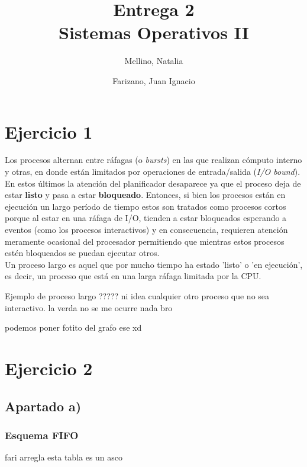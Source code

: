 \documentclass[11pt]{article}
\title{
    Entrega 2 \\
    \large Sistemas Operativos II}
\author{Mellino, Natalia \and Farizano, Juan Ignacio}
\date{}
\begin{document}
\maketitle


\section*{Ejercicio 1}

Los procesos alternan entre ráfagas (o \emph{bursts}) en las que realizan cómputo interno
y otras, en donde están limitados por operaciones de entrada/salida (\emph{I/O bound}). 
En estos últimos la atención del planificador desaparece ya que el proceso deja de
estar \textbf{listo} y pasa a estar \textbf{bloqueado}. Entonces, si bien los procesos están en ejecución un largo período de tiempo estos
son tratados como procesos cortos porque al estar en una ráfaga de I/O, tienden
a estar bloqueados esperando a eventos (como los procesos interactivos) y en consecuencia,
requieren atención meramente ocasional del procesador permitiendo que mientras estos
procesos estén bloqueados se puedan ejecutar otros. \\ %

Un proceso largo es aquel que por mucho tiempo ha estado 'listo' o 'en ejecución', es decir,
un proceso que está en una larga ráfaga limitada por la CPU.

Ejemplo de proceso largo ????? ni idea
cualquier otro proceso que no sea interactivo. la verda no se me ocurre nada bro

podemos poner fotito del grafo ese xd

\section*{Ejercicio 2}

\subsection*{Apartado a)}

\subsubsection*{Esquema FIFO}

fari arregla esta tabla es un asco
\end{document}
